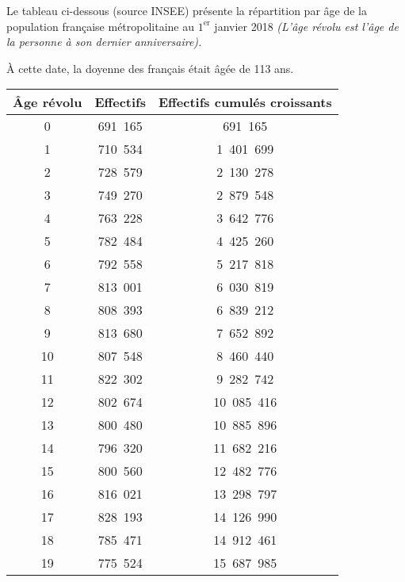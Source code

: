 
\par
\par
Le tableau ci-dessous (source INSEE) présente la répartition par âge de la population française métropolitaine au $1^\text{er}$ janvier 2018
\textit{(L'âge révolu est l'âge de la personne à son dernier anniversaire).}
\par
\`A cette date, la doyenne des français était âgée de 113 ans.
\begin{center}
     \begin{tabular}{|c|c|c|}\hline %
          \textbf{Âge révolu}  &  \textbf{Effectifs}  &  \textbf{Effectifs cumulés croissants} \\ \hline
          0  &  691~165  &  691~165 \\ \hline
          1  &  710~534  &  1~401~699 \\ \hline
          2  &  728~579  &  2~130~278 \\ \hline
          3  &  749~270  &  2~879~548 \\ \hline
          4  &  763~228  &  3~642~776 \\ \hline
          5  &  782~484  &  4~425~260 \\ \hline
          6  &  792~558  &  5~217~818 \\ \hline
          7  &  813~001  &  6~030~819 \\ \hline
          8  &  808~393  &  6~839~212 \\ \hline
          9  &  813~680  &  7~652~892 \\ \hline
          10  &  807~548  &  8~460~440 \\ \hline
          11  &  822~302  &  9~282~742 \\ \hline
          12  &  802~674  &  10~085~416 \\ \hline
          13  &  800~480  &  10~885~896 \\ \hline
          14  &  796~320  &  11~682~216 \\ \hline
          15  &  800~560  &  12~482~776 \\ \hline
          16  &  816~021  &  13~298~797 \\ \hline
          17  &  828~193  &  14~126~990 \\ \hline
          18  &  785~471  &  14~912~461 \\ \hline
          19  &  775~524  &  15~687~985 \\ \hline

\end{tabular}
\end{center}
